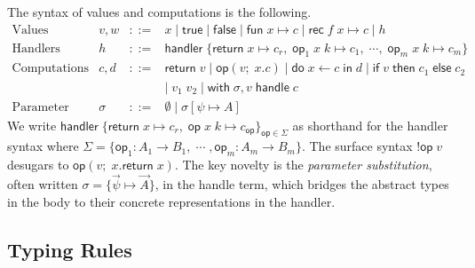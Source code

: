 \documentclass[acmsmall,screen,review,anonymous]{acmart}
\newcommand{\op}{\mathsf{op}}
\newcommand{\ret}{\mathsf{return}\;}
\newcommand{\ddo}{\mathsf{do}\;}
\newcommand{\iin}{\;\mathsf{in}\;}
\newcommand{\iif}{\mathsf{if}\;}
\newcommand{\then}{\;\mathsf{then}\;}
\newcommand{\eelse}{\;\mathsf{else}\;}
\newcommand{\fun}{\mathsf{fun}\;}
\newcommand{\recmark}{\mathsf{rec}\;}
\newcommand{\hhandler}{\mathsf{handler}}
\newcommand{\with}{\mathsf{with}\;}
\newcommand{\handle}{\;\mathsf{handle}\;}
\newcommand{\ttrue}{\mathsf{true}}
\newcommand{\ffalse}{\mathsf{false}}
\newcommand{\Sig}{\Sigma}
\begin{document}
The syntax of values and computations is the following.
\[
\begin{array}{lrcl}
  \text{Values}       & v, w & ::= & x \mid \ttrue \mid \ffalse
                                     \mid \fun x \mapsto c \mid \recmark f\;x \mapsto c \mid h \\[4pt]
  \text{Handlers}      & h    & ::= &
    \hhandler\;\{
      \ret x \mapsto c_r,\;
      \op_1\; x\; k \mapsto c_1,\; \cdots,\;
      \op_m\; x\; k \mapsto c_m
  \} \\[4pt]
  \text{Computations} & c, d & ::= & \ret v \mid \op(v;\;x.c)\mid \ddo x \leftarrow c \iin d 
                                     \mid \iif v \then c_1 \eelse c_2 \\[2pt]
                      &      &     & \mid\; v_1\;v_2 \mid \with \sigma, v \handle c \\[4pt]
  \text{Parameter subst.} & \sigma & ::= & \emptyset \mid \sigma[\psi \mapsto A]
\end{array}
\]
We write $\hhandler\;\{ \ret x \mapsto c_r,\; \op\; x\; k \mapsto c_\op \}_{\op\in\Sig}$ as shorthand for the handler syntax where
$\Sig = \{\op_1 : A_1 \to B_1, \; \cdots\;, \op_m : A_m \to B_m \}$.
The surface syntax $!\op\;v$ desugars to $\op(v;\;x.\ret x)$.
The key novelty is the \emph{parameter substitution}, often written $\sigma = \{\vec{\psi} \mapsto \vec{A}\}$, in the handle term,
which bridges the abstract types in the body to their concrete representations in the handler.

\subsection{Typing Rules}\label{sec:typing}
\end{document}
